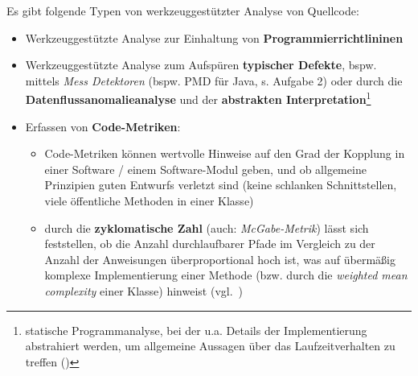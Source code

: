 

Es gibt folgende Typen von werkzeuggestützter Analyse von Quellcode:

\begin{itemize}
    \item Werkzeuggestützte Analyse zur Einhaltung von \textbf{Programmierrichtlininen}
    \item Werkzeuggestützte Analyse zum Aufspüren \textbf{typischer Defekte}, bspw. mittels \textit{Mess Detektoren} (bspw. PMD für Java, s. Aufgabe 2) oder durch die \textbf{Datenflussanomalieanalyse} und der \textbf{abstrakten Interpretation}\footnote{
    statische Programmanalyse, bei der u.a. Details der Implementierung abstrahiert werden, um allgemeine Aussagen über das Laufzeitverhalten zu treffen (\cite{CC77})
    }
    \item Erfassen von \textbf{Code-Metriken}:
    \begin{itemize}
        \item Code-Metriken können wertvolle Hinweise auf den Grad der Kopplung in einer Software / einem Software-Modul geben, und ob allgemeine Prinzipien guten Entwurfs verletzt sind (keine schlanken Schnittstellen, viele öffentliche Methoden in einer Klasse)
        \item durch die \textbf{zyklomatische Zahl} (auch: \textit{McGabe-Metrik}) lässt sich feststellen, ob die Anzahl durchlaufbarer Pfade im Vergleich zu der Anzahl der Anweisungen überproportional hoch ist, was auf übermäßig komplexe Implementierung einer Methode (bzw. durch die \textit{weighted mean complexity} einer Klasse) hinweist (vgl.~\cite[Abb. 4.3, 37]{Wed09c})
    \end{itemize}
\end{itemize}